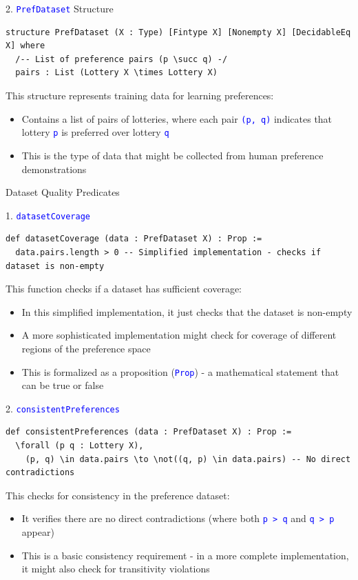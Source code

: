 \documentclass{article}
\theoremstyle{definition}
\newcommand{\tactic}[1]{\textcolor{blue}{\texttt{#1}}}
\begin{document}
2. \tactic{PrefDataset} Structure
\begin{lstlisting}
structure PrefDataset (X : Type) [Fintype X] [Nonempty X] [DecidableEq X] where
  /-- List of preference pairs (p \succ q) -/
  pairs : List (Lottery X \times Lottery X)
\end{lstlisting}
This structure represents training data for learning preferences:
\begin{itemize}
  \item Contains a list of pairs of lotteries, where each pair \tactic{(p, q)} indicates that lottery \tactic{p} is preferred over lottery \tactic{q}
  \item This is the type of data that might be collected from human preference demonstrations
\end{itemize}

Dataset Quality Predicates

1. \tactic{datasetCoverage}
\begin{lstlisting}
def datasetCoverage (data : PrefDataset X) : Prop :=
  data.pairs.length > 0 -- Simplified implementation - checks if dataset is non-empty
\end{lstlisting}
This function checks if a dataset has sufficient coverage:
\begin{itemize}
  \item In this simplified implementation, it just checks that the dataset is non-empty
  \item A more sophisticated implementation might check for coverage of different regions of the preference space
  \item This is formalized as a proposition (\tactic{Prop}) - a mathematical statement that can be true or false
\end{itemize}

2. \tactic{consistentPreferences}
\begin{lstlisting}
def consistentPreferences (data : PrefDataset X) : Prop :=
  \forall (p q : Lottery X),
    (p, q) \in data.pairs \to \not((q, p) \in data.pairs) -- No direct contradictions
\end{lstlisting}
This checks for consistency in the preference dataset:
\begin{itemize}
  \item It verifies there are no direct contradictions (where both \tactic{p > q} and \tactic{q > p} appear)
  \item This is a basic consistency requirement - in a more complete implementation, it might also check for transitivity violations
\end{itemize}
\end{document}
